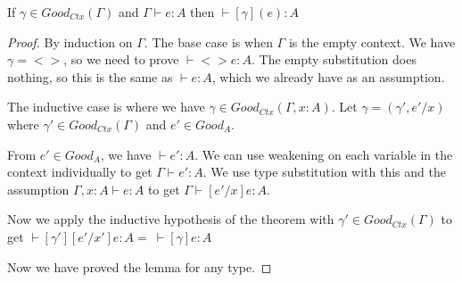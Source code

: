 \vspace{1cm}

\begin{lem}\label{closedgamma}
If $\gamma \in Good_{Ctx}(\Gamma)$ and $\Gamma \vdash e : A$ then $\vdash [\gamma](e) : A$
\end{lem}

\begin{proof}
By induction on $\Gamma$. The base case is when $\Gamma$ is the empty context. We have $\gamma = <>$, so we need to prove $\vdash <>e : A$. The empty substitution does nothing, so this is the same as $\vdash e : A$, which we already have as an assumption.

The inductive case is where we have $\gamma \in Good_{Ctx}(\Gamma,x:A)$. Let $\gamma = (\gamma',e'/x)$ where $\gamma' \in Good_{Ctx}(\Gamma)$ and $e' \in  Good_A$. 

From $e' \in Good_A$, we have $\vdash e' : A$. We can use weakening on each variable in the context individually to get $\Gamma \vdash e' : A$. We use type substitution with this and the assumption $\Gamma, x:A \vdash e:A$ to get $\Gamma \vdash  [e'/x]e : A$.

Now we apply the inductive hypothesis of the theorem with $\gamma' \in Good_{Ctx}(\Gamma)$ to get $\vdash [\gamma'][e'/x'] e : A =  \ \vdash [\gamma]e : A$

Now we have proved the lemma for any type.
\end{proof}